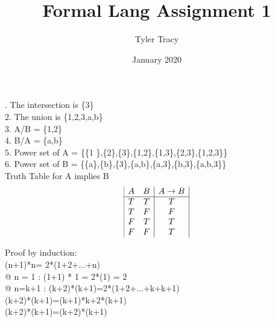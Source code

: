 \documentclass{article}
\title{Formal Lang Assignment 1}
\author{Tyler Tracy}
\date{January 2020}
\begin{document}
. The intersection is \{3\} \\
2. The union is \{1,2,3,a,b\} \\
3. A/B = \{1,2\} \\
4. B/A = \{a,b\} \\
5. Power set of A = \{\{1 \},\{2\},\{3\},\{1,2\},\{1,3\},\{2,3\},\{1,2,3\}\} \\
6. Power set of B = \{\{a\},\{b\},\{3\},\{a,b\},\{a,3\},\{b,3\},\{a,b,3\}\} \\

Truth Table for A implies B
\begin{displaymath}
\begin{array}{|c c|c|}
A & B & A \rightarrow B\\ %
\hline %
T & T & T\\
T & F & F\\
F & T & T\\
F & F & T\\
\end{array}
\end{displaymath}


Proof by induction: \\
(n+1)*n= 2*(1+2+...+n) \\
@ n = 1 : (1+1) * 1 = 2*(1) = 2 \\
@ n=k+1 : (k+2)*(k+1)=2*(1+2+...+k+k+1) \\
	    (k+2)*(k+1)=(k+1)*k+2*(k+1) \\
	    (k+2)*(k+1)=(k+2)*(k+1) \\
\end{document}
